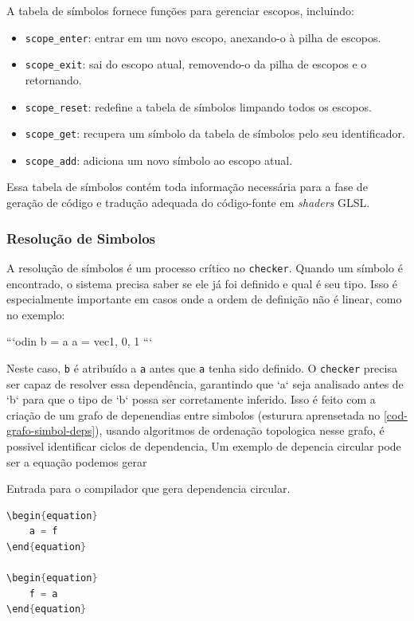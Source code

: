 A tabela de símbolos fornece funções para gerenciar escopos, incluindo:
\begin{itemize}
    \item \texttt{scope\_enter}: entrar em um novo escopo, anexando-o à pilha de escopos.
    \item \texttt{scope\_exit}: sai do escopo atual, removendo-o da pilha de escopos e o retornando.
    \item \texttt{scope\_reset}: redefine a tabela de símbolos limpando todos os escopos.
    \item \texttt{scope\_get}: recupera um símbolo da tabela de símbolos pelo seu identificador.
    \item \texttt{scope\_add}: adiciona um novo símbolo ao escopo atual.
\end{itemize}


Essa tabela de símbolos contém toda informação necessária para a fase de geração de código e tradução adequada do código-fonte em \textit{shaders} GLSL.

\subsubsection{Resolução de Simbolos}
A resolução de símbolos é um processo crítico no \verb`checker`. Quando um símbolo é encontrado, o sistema precisa saber se ele já foi definido e qual é seu tipo. Isso é especialmente importante em casos onde a ordem de definição não é linear, como no exemplo:

```odin
b = a
a = vec{1, 0, 1}
```

Neste caso, \verb`b` é atribuído a \verb`a` antes que \verb`a` tenha sido definido. O \verb`checker` precisa ser capaz de resolver essa dependência, garantindo que `a` seja analisado antes de `b` para que o tipo de `b` possa ser corretamente inferido. Isso é feito com a criação de um grafo de depenendias entre simbolos (esturura aprensetada no \autoref{cod-grafo-simbol-deps}), usando algoritmos de ordenação topologica nesse grafo, é possivel identificar ciclos de dependencia, Um exemplo de depencia circular pode ser a equação  podemos gerar
\begin{codigo}[htb]
    \caption{\small Entrada para o compilador que gera dependencia circular. }
    \label{cod-grafo-simbol-deps}
\begin{lstlisting}[language=C, numbers=none, frame=none, inputencoding=latin1]
\begin{equation}
    a = f
\end{equation}

\begin{equation}
    f = a
\end{equation}

\end{lstlisting}
\end{codigo}

